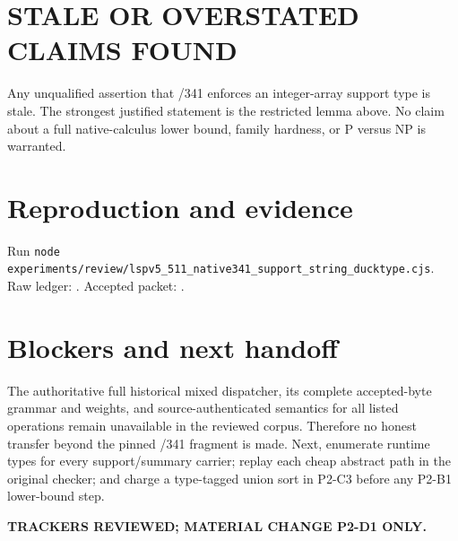 \documentclass[11pt]{article}
\begin{document}
\section*{STALE OR OVERSTATED CLAIMS FOUND}
Any unqualified assertion that /341 enforces an integer-array support type is stale.  The strongest justified statement is the restricted lemma above.  No claim about a full native-calculus lower bound, family hardness, or P versus NP is warranted.

\section*{Reproduction and evidence}
Run \texttt{node experiments/review/lspv5\_511\_native341\_support\_string\_ducktype.cjs}.  Raw ledger:
.
Accepted packet:
.

\section*{Blockers and next handoff}
The authoritative full historical mixed dispatcher, its complete accepted-byte grammar and weights, and source-authenticated semantics for all listed operations remain unavailable in the reviewed corpus.  Therefore no honest transfer beyond the pinned /341 fragment is made.  Next, enumerate runtime types for every support/summary carrier; replay each cheap abstract path in the original checker; and charge a type-tagged union sort in P2-C3 before any P2-B1 lower-bound step.

\bigskip
\noindent\textbf{TRACKERS REVIEWED; MATERIAL CHANGE P2-D1 ONLY.}
\end{document}
